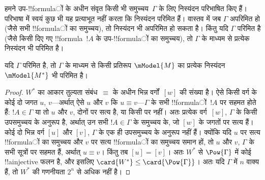 \documentclass[../../../include/open-logic-section]{subfiles}
\begin{document}


हमने उप-!!{formula}ों के अधीन संवृत किसी भी समुच्चय~$\Gamma$ के लिए
निस्यंदन परिभाषित किए हैं। परिभाषा में स्वयं कुछ भी यह प्रत्याभूत नहीं
करता कि निस्यंदन परिमित हैं। वास्तव में जब $\Gamma$ अपरिमित हो (जैसे सभी
!!{formula}ों का समुच्चय), तो निस्यंदन भी अपरिमित हो सकता है। किंतु यदि
$\Gamma$ परिमित है (जैसे किसी दिए गए !!{formula}~$!A$ के उप-!!{formula}ों का
समुच्चय), तो $\Gamma$ के माध्यम से प्रत्येक निस्यंदन भी परिमित है।

\begin{prop}
  यदि $\Gamma$ परिमित है, तो $\Gamma$ के माध्यम से किसी प्रतिरूप
  $\mModel{M}$ का प्रत्येक निस्यंदन $\mModel{M^*}$ भी परिमित है।
\end{prop}

\begin{proof}
  $W^*$ का आकार तुल्यता संबंध~$\equiv$ के अधीन भिन्न वर्गों~$[w]$ की
  संख्या है। ऐसे किसी वर्ग के कोई दो जगत $u$, $v$---अर्थात् ऐसे $u$ और
  $v$ कि $u \equiv v$---$\Gamma$ के सभी !!{formula}ों~$!A$ पर सहमत होते
  हैं: $!A \in \Gamma$ या तो $u$ और $v$, दोनों पर सत्य है, या किसी पर
  नहीं। अतः प्रत्येक वर्ग~$[w]$, $\Gamma$ के किसी उपसमुच्चय के अनुरूप है,
  अर्थात् उन सभी $!A \in \Gamma$ के समुच्चय के, जो $[w]$ के जगतों पर
  सत्य हैं। कोई दो भिन्न वर्ग $[u]$ और $[v]$, $\Gamma$ के एक ही उपसमुच्चय
  के अनुरूप नहीं हैं। क्योंकि यदि $u$ पर सत्य !!{formula}ों का समुच्चय और
  $v$ पर सत्य !!{formula}ों का समुच्चय समान हों, तो $u$ और $v$, $\Gamma$ के
  सभी सूत्रों पर सहमत हैं, अर्थात् $u \equiv v$। किंतु तब $[u] = [v]$।
  अतः $W^*$ से $\Pow{\Gamma}$ में कोई !!a{injective} फलन है, और इसलिए
  $\card{W^*} \le \card{\Pow{\Gamma}}$। अतः यदि $\Gamma$ में $n$ वाक्य
  हैं, तो $W^*$ की गणनीयता $2^n$ से अधिक नहीं है।
\end{proof}
\end{document}

